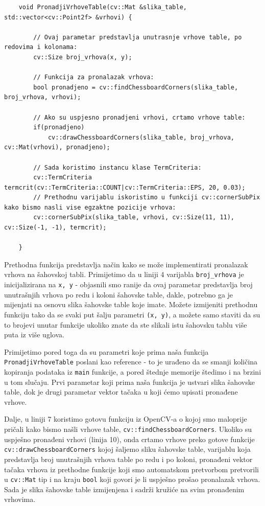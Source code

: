 \documentclass[a4paper, 12pt]{article}
\begin{document}
\begin{lstlisting}
    void PronadjiVrhoveTable(cv::Mat &slika_table, std::vector<cv::Point2f> &vrhovi) {

        // Ovaj parametar predstavlja unutrasnje vrhove table, po redovima i kolonama:
        cv::Size broj_vrhova(x, y);

        // Funkcija za pronalazak vrhova:
        bool pronadjeno = cv::findChessboardCorners(slika_table, broj_vrhova, vrhovi);

        // Ako su uspjesno pronadjeni vrhovi, crtamo vrhove table:
        if(pronadjeno)
            cv::drawChessboardCorners(slika_table, broj_vrhova, cv::Mat(vrhovi), pronadjeno);

        // Sada koristimo instancu klase TermCriteria:
        cv::TermCriteria termcrit(cv::TermCriteria::COUNT|cv::TermCriteria::EPS, 20, 0.03);
        // Prethodnu varijablu iskoristimo u funkciji cv::cornerSubPix kako bismo nasli vise egzaktne pozicije vrhova:
        cv::cornerSubPix(slika_table, vrhovi, cv::Size(11, 11), cv::Size(-1, -1), termcrit);
        
    }
\end{lstlisting}

Prethodna funkcija predstavlja način kako se može implementirati pronalazak vrhova na šahovskoj tabli. Primijetimo da u liniji 4 varijabla \lstinline{broj_vrhova} je inicijalizirana na \lstinline{x, y} - objasnili smo ranije da ovaj parametar predstavlja broj unutrašnjih vrhova po redu i koloni šahovske table, dakle, potrebno ga je mijenjati na osnovu slika šahovske table koje imate. Možete izmijeniti prethodnu funkciju tako da se svaki put šalju parametri \lstinline{(x, y)}, a možete samo staviti da su to brojevi unutar funkcije ukoliko znate da ste slikali istu šahovsku tablu više puta iz više uglova. 

Primijetimo pored toga da su parametri koje prima naša funkcija \lstinline{PronadjiVrhoveTable} poslani kao reference - to je urađeno da se smanji količina kopiranja podataka iz \lstinline{main} funkcije, a pored štednje memorije štedimo i na brzini u tom slučaju. Prvi parametar koji prima naša funkcija je ustvari slika šahovske table, dok je drugi parametar vektor tačaka u koji ćemo upisati pronađene vrhove.

Dalje, u liniji 7 koristimo gotovu funkciju iz OpenCV-a o kojoj smo maloprije pričali kako bismo našli vrhove table, \lstinline{cv::findChessboardCorners}. Ukoliko su uspješno pronađeni vrhovi (linija 10), onda crtamo vrhove preko gotove funkcije \lstinline{cv::drawChessboardCorners} kojoj šaljemo sliku šahovske table, varijablu koja predstavlja broj unutrašnjih vrhova table po redu i po koloni, pronađeni vektor tačaka vrhova iz prethodne funkcije koji smo automatskom pretvorbom pretvorili u \lstinline{cv::Mat} tip i na kraju \lstinline{bool} koji govori je li uspješno prošao pronalazak vrhova. Sada je slika šahovske table izmijenjena i sadrži kružiće na svim pronađenim vrhovima.
\end{document}
